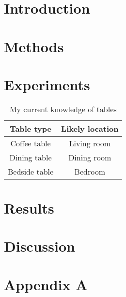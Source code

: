 \documentclass[twoside]{article}
\begin{document}
\begin{multicols}{2} %

\section{Introduction}



\section{Methods}



\section{Experiments}

\begin{table}[H]
\caption{My current knowledge of tables}
\centering
\begin{tabular}{cc}
\textbf{Table type} & \textbf{Likely location}\\
\midrule
Coffee table & Living room\\
Dining table & Dining room\\
Bedside table & Bedroom
\end{tabular}
\end{table}


\section{Results}



\section{Discussion}




{}


\section*{Appendix A}


\end{multicols}
\end{document}
